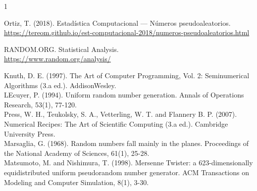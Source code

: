 \documentclass{article}
\begin{document}
\begin{thebibliography}{1}

Ortiz, T. (2018). Estadística Computacional — Números pseudoaleatorios.\\
\url{https://tereom.github.io/est-computacional-2018/numeros-pseudoaleatorios.html}

RANDOM.ORG. Statistical Analysis.\\
\url{https://www.random.org/analysis/}

Knuth, D. E. (1997). The Art of Computer Programming, Vol. 2: Seminumerical Algorithms (3.a ed.). AddisonWesley.\\

LEcuyer, P. (1994). Uniform random number generation. Annals of Operations Research, 53(1), 77-120.\\

Press, W. H., Teukolsky, S. A., Vetterling, W. T. and Flannery B. P. (2007). Numerical Recipes: The Art of Scientific Computing (3.a ed.). Cambridge University Press.\\

Marsaglia, G. (1968). Random numbers fall mainly in the planes. Proceedings of the National Academy of Sciences, 61(1), 25-28.\\

Matsumoto, M. and Nishimura, T. (1998). Mersenne Twister: a 623-dimensionally equidistributed uniform pseudorandom number generator. ACM Transactions on Modeling and Computer Simulation, 8(1), 3-30.\\


\end{thebibliography}
\end{document}
